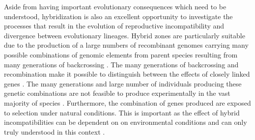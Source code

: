 Aside from having important evolutionary consequences which need to be understood, 
hybridization is also an excellent opportunity to investigate the processes
that result in the evolution of reproductive incompatibility and divergence between 
evolutionary lineages. 
Hybrid zones are particularly suitable due to the production of a large numbers of 
recombinant genomes carrying many possible combinations of genomic elements from parent 
species resulting from many generations of backcrossing \parencite{rieseberg1999}. 
The many generations of backcrossing and recombination make it possible to 
distinguish between the effects of closely linked genes \parencite{rieseberg1999}. 
The many generations and large number of individuals producing these genetic 
combinations are not feasible to produce experimentally in the vast majority of
species \parencite{rieseberg1999}. 
Furthermore, the combination of genes produced are exposed to selection 
under natural conditions. 
This is important as the effect of hybrid incompatibilities can be dependent on 
on environmental conditions and can only truly understood in this context \parencite{miller2016}. 


